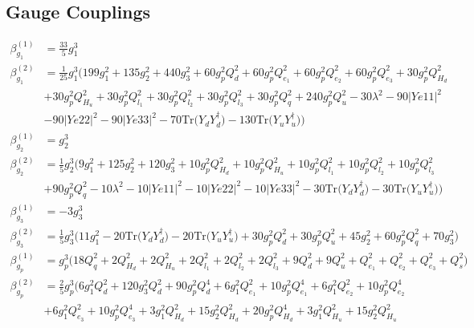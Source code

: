 \subsection{Gauge Couplings}
{\allowdisplaybreaks  \begin{align} 
\beta_{g_1}^{(1)} & =  
\frac{33}{5} g_{1}^{3} \\ 
\beta_{g_1}^{(2)} & =  
\frac{1}{25} g_{1}^{3} \Big(199 g_{1}^{2} +135 g_{2}^{2} +440 g_{3}^{2} +60 g_{p}^{2} Q_{d}^{2} +60 g_{p}^{2} Q_{e_{1}}^{2} +60 g_{p}^{2} Q_{e_{2}}^{2} +60 g_{p}^{2} Q_{e_3}^{2} +30 g_{p}^{2} Q_{H_d}^{2} \nonumber \\ 
 &+30 g_{p}^{2} Q_{H_u}^{2} +30 g_{p}^{2} Q_{l_1}^{2} +30 g_{p}^{2} Q_{l_2}^{2} +30 g_{p}^{2} Q_{l_3}^{2} +30 g_{p}^{2} Q_{q}^{2} +240 g_{p}^{2} Q_{u}^{2} -30 \lambda^{2} -90 |Ye11|^2 \nonumber \\ 
 &-90 |Ye22|^2 -90 |Ye33|^2 -70 \mbox{Tr}\Big({Y_d  Y_{d}^{\dagger}}\Big) -130 \mbox{Tr}\Big({Y_u  Y_{u}^{\dagger}}\Big) \Big)\\ 
\beta_{g_2}^{(1)} & =  
g_{2}^{3}\\ 
\beta_{g_2}^{(2)} & =  
\frac{1}{5} g_{2}^{3} \Big(9 g_{1}^{2} +125 g_{2}^{2} +120 g_{3}^{2} +10 g_{p}^{2} Q_{H_d}^{2} +10 g_{p}^{2} Q_{H_u}^{2} +10 g_{p}^{2} Q_{l_1}^{2} +10 g_{p}^{2} Q_{l_2}^{2} +10 g_{p}^{2} Q_{l_3}^{2} \nonumber \\ 
 &+90 g_{p}^{2} Q_{q}^{2} -10 \lambda^{2} -10 |Ye11|^2 -10 |Ye22|^2 -10 |Ye33|^2 -30 \mbox{Tr}\Big({Y_d  Y_{d}^{\dagger}}\Big) -30 \mbox{Tr}\Big({Y_u  Y_{u}^{\dagger}}\Big) \Big)\\ 
\beta_{g_3}^{(1)} & =  
-3 g_{3}^{3} \\ 
\beta_{g_3}^{(2)} & =  
\frac{1}{5} g_{3}^{3} \Big(11 g_{1}^{2}  -20 \mbox{Tr}\Big({Y_d  Y_{d}^{\dagger}}\Big)  -20 \mbox{Tr}\Big({Y_u  Y_{u}^{\dagger}}\Big)  + 30 g_{p}^{2} Q_{d}^{2}  + 30 g_{p}^{2} Q_{u}^{2}  + 45 g_{2}^{2}  + 60 g_{p}^{2} Q_{q}^{2}  + 70 g_{3}^{2} \Big)\\ 
\beta_{g_p}^{(1)} & =  
g_{p}^{3} \Big(18 Q_{q}^{2}  + 2 Q_{H_d}^{2}  + 2 Q_{H_u}^{2}  + 2 Q_{l_1}^{2}  + 2 Q_{l_2}^{2}  + 2 Q_{l_3}^{2}  + 9 Q_{d}^{2}  + 9 Q_{u}^{2}  + Q_{e_{1}}^{2} + Q_{e_{2}}^{2} + Q_{e_3}^{2} + Q_{s}^{2}\Big)\\ 
\beta_{g_p}^{(2)} & =  
\frac{2}{5} g_{p}^{3} \Big(6 g_{1}^{2} Q_{d}^{2} +120 g_{3}^{2} Q_{d}^{2} +90 g_{p}^{2} Q_{d}^{4} +6 g_{1}^{2} Q_{e_{1}}^{2} +10 g_{p}^{2} Q_{e_{1}}^{4} +6 g_{1}^{2} Q_{e_{2}}^{2} +10 g_{p}^{2} Q_{e_{2}}^{4} \nonumber \\ 
 &+6 g_{1}^{2} Q_{e_3}^{2} +10 g_{p}^{2} Q_{e_3}^{4} +3 g_{1}^{2} Q_{H_d}^{2} +15 g_{2}^{2} Q_{H_d}^{2} +20 g_{p}^{2} Q_{H_d}^{4} +3 g_{1}^{2} Q_{H_u}^{2} +15 g_{2}^{2} Q_{H_u}^{2} \nonumber \\ 

\end{align}}
